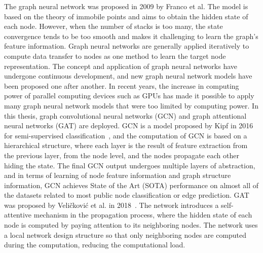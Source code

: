 
The graph neural network was proposed in 2009 by Franco et al. The model is based on the theory of immobile points and aims to obtain the hidden state of each node. However, when the number of stacks is too many, the state convergence tends to be too smooth and makes it challenging to learn the graph's feature information. Graph neural networks are generally applied iteratively to compute data transfer to nodes as one method to learn the target node representation. The concept and application of graph neural networks have undergone continuous development, and new graph neural network models have been proposed one after another. In recent years, the increase in computing power of parallel computing devices such as GPUs has made it possible to apply many graph neural network models that were too limited by computing power. In this thesis, graph convolutional neural networks (GCN) and graph attentional neural networks (GAT) are deployed. GCN is a model proposed by Kipf in 2016 for semi-supervised classification~\cite{kipf2017semi}, and the computation of GCN is based on a hierarchical structure, where each layer is the result of feature extraction from the previous layer, from the node level, and the nodes propagate each other hiding the state. The final GCN output undergoes multiple layers of abstraction, and in terms of learning of node feature information and graph structure information, GCN achieves State of the Art (SOTA) performance on almost all of the datasets related to most public node classification or edge prediction. GAT was proposed by Veličković et al. in 2018~\cite{veli2018graph}. The network introduces a self-attentive mechanism in the propagation process, where the hidden state of each node is computed by paying attention to its neighboring nodes. The network uses a local network design structure so that only neighboring nodes are computed during the computation, reducing the computational load.

